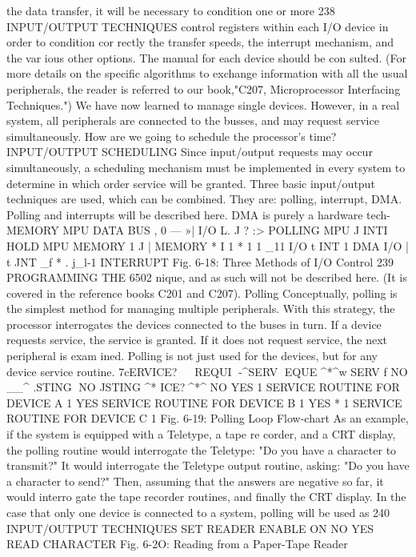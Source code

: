 the data transfer, it will be necessary to condition one or more
238
INPUT/OUTPUT TECHNIQUES
control registers within each I/O device in order to condition cor
rectly the transfer speeds, the interrupt mechanism, and the var
ious other options. The manual for each device should be con
sulted. (For more details on the specific algorithms to exchange
information with all the usual peripherals, the reader is referred
to our book,"C207, Microprocessor Interfacing Techniques.")
We have now learned to manage single devices. However, in a
real system, all peripherals are connected to the busses, and may
request service simultaneously. How are we going to schedule the
processor's time?
INPUT/OUTPUT SCHEDULING
Since input/output requests may occur simultaneously, a
scheduling mechanism must be implemented in every system to
determine in which order service will be granted. Three basic
input/output techniques are used, which can be combined.
They are: polling, interrupt, DMA. Polling and interrupts
will be described here. DMA is purely a hardware tech-
MEMORY
MPU
DATA BUS
, 0
— »| I/O
L.
J ?
:> POLLING
MPU
J
INTI
HOLD
MPU
MEMORY
1
J
| MEMORY
* I 1 *
1 1 _11
I/O
t INT
1
DMA
I/O |
t JNT
_f * .
j_l-1
INTERRUPT
Fig. 6-18: Three Methods of I/O Control
239
PROGRAMMING THE 6502
nique, and as such will not be described here. (It is covered in
the reference books C201 and C207).
Polling
Conceptually, polling is the simplest method for managing multiple
peripherals. With this strategy, the processor interrogates the devices
connected to the buses in turn. If a device requests service, the service
is granted. If it does not request service, the next peripheral is exam
ined. Polling is not just used for the devices, but for any device service
routine.
^^wcERVICE? ^^^
^^^ REQUI
^^^-^SERV
^^REQUE
^*^w SERV
f
NO
__^
.STING^^V
NO
^^
STING ^*
ICE?^^^^*^
NO
YES
1
SERVICE ROUTINE
FOR DEVICE A
1
YES
SERVICE ROUTINE
FOR DEVICE B
1
YES
* 1
SERVICE ROUTINE
FOR DEVICE C
1
Fig. 6-19: Polling Loop Flow-chart
As an example, if the system is equipped with a Teletype, a tape re
corder, and a CRT display, the polling routine would interrogate the
Teletype: "Do you have a character to transmit?" It would interrogate
the Teletype output routine, asking: "Do you have a character to send?"
Then, assuming that the answers are negative so far, it would interro
gate the tape recorder routines, and finally the CRT display. In the case
that only one device is connected to a system, polling will be used as
240
INPUT/OUTPUT TECHNIQUES
SET READER
ENABLE ON
NO
YES
READ CHARACTER
Fig. 6-2O: Reading from a Paper-Tape Reader
